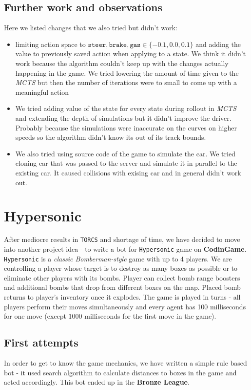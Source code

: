 \documentclass[11pt]{article}
\begin{document}
    \subsection{Further work and observations}
    Here we listed changes that we also tried but didn't work:
    \begin{itemize}
        \item limiting action space to $\texttt{steer}, \texttt{brake}, \texttt{gas} \in\{-0.1, 0.0, 0.1\}$ and adding the value to previously saved action when applying to a state. We think it didn't work because the algorithm couldn't keep up with the changes actually happening in the game. We tried lowering the amount of time given to the \textit{MCTS} but then the number of iterations were to small to come up with a meaningful action
        \item We tried adding value of the state for every state during rollout in \textit{MCTS} and extending the depth of simulations but it didn't improve the driver. Probably because the simulations were inaccurate on the curves on higher speeds so the algorithm didn't know its out of its track bounds.
        
        \item We also tried using source code of the game to simulate the car. We tried cloning car that was passed to the server and simulate it in parallel to the existing car. It caused collisions with exising car and in general didn't work out.
    \end{itemize}
    
	
	\section{Hypersonic}
	After mediocre results in \texttt{TORCS} and shortage of time, we have decided to move into another project idea - to write a bot for \texttt{Hypersonic} game on \textbf{CodinGame}. \texttt{Hypersonic} is a \textit{classic Bomberman-style} game with up to 4 players. We are controlling a player whose target is to destroy as many boxes as possible or to eliminate other players with its bombs. Player can collect bomb range boosters and additional bombs that drop from different boxes on the map. Placed bomb returns to player's inventory once it explodes. The game is played in turns - all players perform their moves simultaneously and every agent has 100 milliseconds for one move (except 1000 milliseconds for the first move in the game).
	
	\subsection{First attempts}
	In order to get to know the game mechanics, we have written a simple rule based bot - it used search algorithm to calculate distances to boxes in the game and acted accordingly. This bot ended up in the \textbf{Bronze League}.
	
\end{document}
